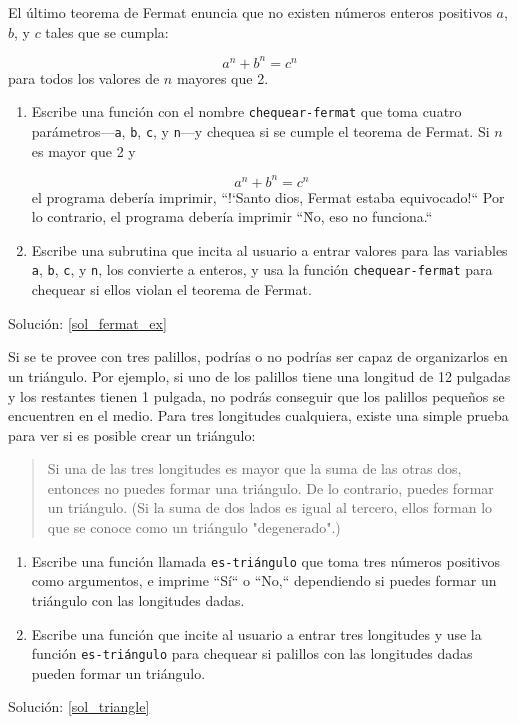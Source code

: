 \begin{exercise}
\label{fermat_ex}

El último teorema de Fermat enuncia que no existen números enteros
positivos $a$, $b$, y $c$ tales que se cumpla:

\[ a^n + b^n = c^n \]
%
para todos los valores de $n$ mayores que 2.

\begin{enumerate}

\item Escribe una función con el nombre \verb|chequear-fermat| que
toma cuatro parámetros---{\tt a}, {\tt b}, {\tt c}, y {\tt n}---y
chequea si se cumple el teorema de Fermat. Si $n$ es mayor que 2 y 

\[a^n + b^n = c^n \]
%
el programa debería imprimir, ``!`Santo dios, Fermat estaba equivocado!``
Por lo contrario, el programa debería imprimir ``Ǹo, eso no funciona.``

\item Escribe una subrutina que incita al usuario a entrar valores para 
las variables {\tt a}, {\tt b}, {\tt c}, y {\tt n}, los convierte a enteros,
y usa la función \verb|chequear-fermat| para chequear si ellos violan
el teorema de Fermat.
\end{enumerate}

Solución: \ref{sol_fermat_ex}


\end{exercise}


\begin{exercise}
\label{triangle}

Si se te provee con tres palillos, podrías o no podrías 
ser capaz de organizarlos en un triángulo.
Por ejemplo, si uno de los palillos tiene una longitud de 
12 pulgadas y los restantes tienen 1 pulgada, no podrás
conseguir que los palillos pequeños se encuentren en 
el medio. Para tres longitudes cualquiera, existe una 
simple prueba para ver si es posible crear un triángulo:

\begin{quotation}
Si una de las tres longitudes es mayor que la suma de las
otras dos, entonces no puedes formar una triángulo. De lo
contrario, puedes formar un triángulo. (Si la suma de dos
lados es igual al tercero, ellos forman lo que se
conoce como un triángulo "degenerado".)
\end{quotation}

\begin{enumerate}

\item Escribe una función llamada \verb|es-triángulo| que toma
tres números positivos como argumentos, e imprime ``Sí`` o ``No,``
dependiendo si puedes formar un triángulo con las longitudes
dadas.

\item Escribe una función que incite al usuario a entrar
tres longitudes y use la función \verb|es-triángulo| para 
chequear si palillos con las longitudes dadas pueden formar 
un triángulo.
\end{enumerate}

Solución: \ref{sol_triangle}


\end{exercise}

